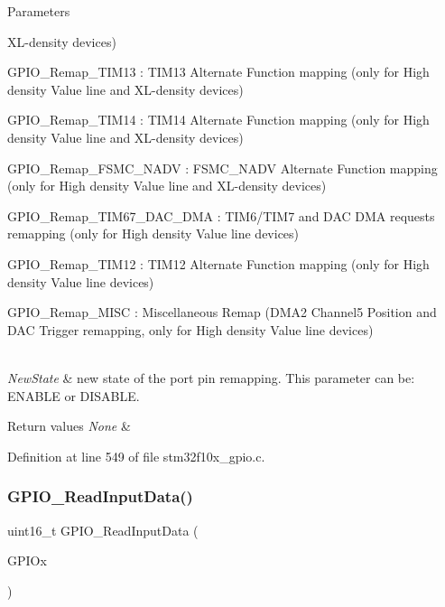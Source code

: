 \begin{DoxyParams}{Parameters}
\begin{DoxyItemize}
X\+L-\/density devices) \item G\+P\+I\+O\+\_\+\+Remap\+\_\+\+T\+I\+M13 \+: T\+I\+M13 Alternate Function mapping (only for High density Value line and X\+L-\/density devices) \item G\+P\+I\+O\+\_\+\+Remap\+\_\+\+T\+I\+M14 \+: T\+I\+M14 Alternate Function mapping (only for High density Value line and X\+L-\/density devices) \item G\+P\+I\+O\+\_\+\+Remap\+\_\+\+F\+S\+M\+C\+\_\+\+N\+A\+DV \+: F\+S\+M\+C\+\_\+\+N\+A\+DV Alternate Function mapping (only for High density Value line and X\+L-\/density devices) \item G\+P\+I\+O\+\_\+\+Remap\+\_\+\+T\+I\+M67\+\_\+\+D\+A\+C\+\_\+\+D\+MA \+: T\+I\+M6/\+T\+I\+M7 and D\+AC D\+MA requests remapping (only for High density Value line devices) \item G\+P\+I\+O\+\_\+\+Remap\+\_\+\+T\+I\+M12 \+: T\+I\+M12 Alternate Function mapping (only for High density Value line devices) \item G\+P\+I\+O\+\_\+\+Remap\+\_\+\+M\+I\+SC \+: Miscellaneous Remap (D\+M\+A2 Channel5 Position and D\+AC Trigger remapping, only for High density Value line devices) \end{DoxyItemize}
\\
\hline
{\em New\+State} & new state of the port pin remapping. This parameter can be\+: E\+N\+A\+B\+LE or D\+I\+S\+A\+B\+LE. \\
\hline
\end{DoxyParams}

\begin{DoxyRetVals}{Return values}
{\em None} & \\
\hline
\end{DoxyRetVals}


Definition at line 549 of file stm32f10x\+\_\+gpio.\+c.

\mbox{\label{group___g_p_i_o___exported___functions_ga139a33adc8409288e9f193bbebb5a0f7}} 
\subsubsection{\texorpdfstring{G\+P\+I\+O\+\_\+\+Read\+Input\+Data()}{GPIO\_ReadInputData()}}
{\footnotesize\ttfamily uint16\+\_\+t G\+P\+I\+O\+\_\+\+Read\+Input\+Data (\begin{DoxyParamCaption}\item[{\hyperlink{struct_g_p_i_o___type_def}{G\+P\+I\+O\+\_\+\+Type\+Def} $\ast$}]{G\+P\+I\+Ox }\end{DoxyParamCaption})}



